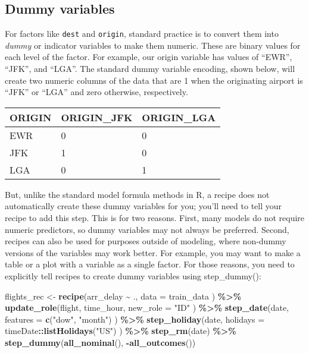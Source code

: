 \documentclass[
]{book}
\newenvironment{Shaded}{\begin{snugshade}}{\end{snugshade}}
\newcommand{\DataTypeTok}[1]{\textcolor[rgb]{0.13,0.29,0.53}{#1}}
\newcommand{\KeywordTok}[1]{\textcolor[rgb]{0.13,0.29,0.53}{\textbf{#1}}}
\newcommand{\NormalTok}[1]{#1}
\newcommand{\OperatorTok}[1]{\textcolor[rgb]{0.81,0.36,0.00}{\textbf{#1}}}
\newcommand{\StringTok}[1]{\textcolor[rgb]{0.31,0.60,0.02}{#1}}
\begin{document}
\hypertarget{dummy-variables}{%
\subsection{Dummy variables}\label{dummy-variables}}

For factors like \texttt{dest} and \texttt{origin}, standard practice is to convert them into \emph{dummy} or indicator variables to make them numeric. These are binary values for each level of the factor. For example, our origin variable has values of ``EWR'', ``JFK'', and ``LGA''. The standard dummy variable encoding, shown below, will create two numeric columns of the data that are 1 when the originating airport is ``JFK'' or ``LGA'' and zero otherwise, respectively.

\begin{longtable}[]{@{}lll@{}}
\toprule
ORIGIN & ORIGIN\_JFK & ORIGIN\_LGA\tabularnewline
\midrule
\endhead
EWR & 0 & 0\tabularnewline
JFK & 1 & 0\tabularnewline
LGA & 0 & 1\tabularnewline
\bottomrule
\end{longtable}

But, unlike the standard model formula methods in R, a recipe does not automatically create these dummy variables for you; you'll need to tell your recipe to add this step. This is for two reasons. First, many models do not require numeric predictors, so dummy variables may not always be preferred. Second, recipes can also be used for purposes outside of modeling, where non-dummy versions of the variables may work better. For example, you may want to make a table or a plot with a variable as a single factor. For those reasons, you need to explicitly tell recipes to create dummy variables using step\_dummy():

\begin{Shaded}
\begin{Highlighting}[]
\NormalTok{flights\_rec \textless{}{-}}
\StringTok{  }\KeywordTok{recipe}\NormalTok{(arr\_delay }\OperatorTok{\textasciitilde{}}\StringTok{ }\NormalTok{.,}
    \DataTypeTok{data =}\NormalTok{ train\_data}
\NormalTok{  ) }\OperatorTok{\%\textgreater{}\%}
\StringTok{  }\KeywordTok{update\_role}\NormalTok{(flight,}
\NormalTok{    time\_hour,}
    \DataTypeTok{new\_role =} \StringTok{"ID"}
\NormalTok{  ) }\OperatorTok{\%\textgreater{}\%}
\StringTok{  }\KeywordTok{step\_date}\NormalTok{(date,}
    \DataTypeTok{features =} \KeywordTok{c}\NormalTok{(}\StringTok{"dow"}\NormalTok{, }\StringTok{"month"}\NormalTok{)}
\NormalTok{  ) }\OperatorTok{\%\textgreater{}\%}
\StringTok{  }\KeywordTok{step\_holiday}\NormalTok{(date,}
    \DataTypeTok{holidays =}\NormalTok{ timeDate}\OperatorTok{::}\KeywordTok{listHolidays}\NormalTok{(}\StringTok{"US"}\NormalTok{)}
\NormalTok{  ) }\OperatorTok{\%\textgreater{}\%}
\StringTok{  }\KeywordTok{step\_rm}\NormalTok{(date) }\OperatorTok{\%\textgreater{}\%}
\StringTok{  }\KeywordTok{step\_dummy}\NormalTok{(}\KeywordTok{all\_nominal}\NormalTok{(), }\OperatorTok{{-}}\KeywordTok{all\_outcomes}\NormalTok{())}
\end{Highlighting}
\end{Shaded}
\end{document}
